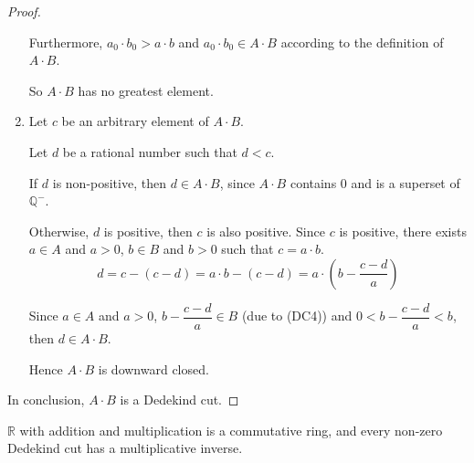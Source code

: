 \begin{proof}
\begin{enumerate}[label = (\roman*)]
              \par Furthermore, $a_{0}\cdot b_{0} > a\cdot b$ and $a_{0}\cdot b_{0}\in A\cdot B$ according to the definition of $A\cdot B$.
              \par So $A\cdot B$ has no greatest element.
        \item Let $c$ be an arbitrary element of $A\cdot B$.
              \par Let $d$ be a rational number such that $d < c$.
              \par If $d$ is non-positive, then $d\in A\cdot B$, since $A\cdot B$ contains $0$ and is a superset of $\mathbb{Q}^{-}$.
              \par Otherwise, $d$ is positive, then $c$ is also positive. Since $c$ is positive, there exists $a\in A$ and $a > 0$, $b\in B$ and $b > 0$ such that $c = a\cdot b$.
              \[
                  d = c - (c - d) = a\cdot b - (c - d) = a\cdot\left(b - \frac{c - d}{a}\right)
              \]
              \par Since $a\in A$ and $a > 0$, $b - \dfrac{c - d}{a}\in B$ (due to (DC4)) and $0 < b - \dfrac{c - d}{a} < b$, then $d \in A\cdot B$.
              \par Hence $A\cdot B$ is downward closed.
    \end{enumerate}
    \par In conclusion, $A\cdot B$ is a Dedekind cut.
\end{proof}

\begin{theorem}
    $\mathbb{R}$ with addition and multiplication is a commutative ring, and every non-zero Dedekind cut has a multiplicative inverse.
\end{theorem}

